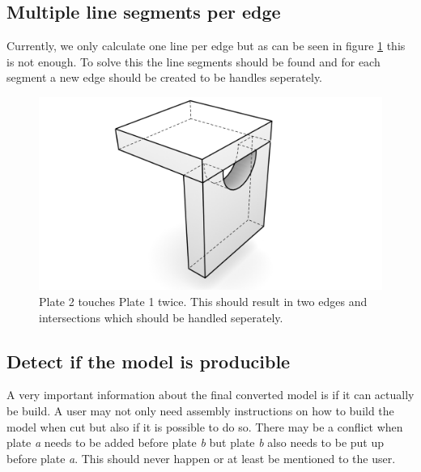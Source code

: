 \documentclass[../ClassicThesis.tex]{subfiles}
\begin{document}
\subsection{Multiple line segments per edge}
Currently, we only calculate one line per edge but as can be seen in figure \ref{fig:twoLineSegments} this is not enough. To solve this the line segments should be found and for each segment a new edge should be created to be handles seperately. 
\begin{figure}[!ht]
\centering
\includegraphics[width=\columnwidth]{Images/Blocks_two_contact(1).png}
\caption{Plate 2 touches Plate 1 twice. This should result in two edges and intersections which should be handled seperately.}
\label{fig:twoLineSegments}
\end{figure}

\subsection{Detect if the model is producible}
A very important information about the final converted model is if it can actually be build. A user may not only need assembly instructions on how to build the model when cut but also if it is possible to do so. There may be a conflict when plate \emph{a} needs to be added before plate \emph{b} but plate \emph{b} also needs to be put up before plate \emph{a}. This should never happen or at least be mentioned to the user.
\end{document}
